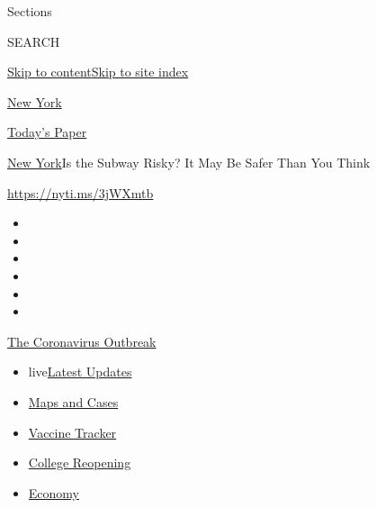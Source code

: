 Sections

SEARCH

\protect\hyperlink{site-content}{Skip to
content}\protect\hyperlink{site-index}{Skip to site index}

\href{https://www.nytimes.com/section/nyregion}{New York}

\href{https://myaccount.nytimes.com/auth/login?response_type=cookie\&client_id=vi}{}

\href{https://www.nytimes.com/section/todayspaper}{Today's Paper}

\href{/section/nyregion}{New York}\textbar{}Is the Subway Risky? It May
Be Safer Than You Think

\url{https://nyti.ms/3jWXmtb}

\begin{itemize}
\item
\item
\item
\item
\item
\item
\end{itemize}

\href{https://www.nytimes.com/news-event/coronavirus?action=click\&pgtype=Article\&state=default\&region=TOP_BANNER\&context=storylines_menu}{The
Coronavirus Outbreak}

\begin{itemize}
\tightlist
\item
  live\href{https://www.nytimes.com/2020/08/03/world/coronavirus-covid-19.html?action=click\&pgtype=Article\&state=default\&region=TOP_BANNER\&context=storylines_menu}{Latest
  Updates}
\item
  \href{https://www.nytimes.com/interactive/2020/us/coronavirus-us-cases.html?action=click\&pgtype=Article\&state=default\&region=TOP_BANNER\&context=storylines_menu}{Maps
  and Cases}
\item
  \href{https://www.nytimes.com/interactive/2020/science/coronavirus-vaccine-tracker.html?action=click\&pgtype=Article\&state=default\&region=TOP_BANNER\&context=storylines_menu}{Vaccine
  Tracker}
\item
  \href{https://www.nytimes.com/2020/08/02/us/covid-college-reopening.html?action=click\&pgtype=Article\&state=default\&region=TOP_BANNER\&context=storylines_menu}{College
  Reopening}
\item
  \href{https://www.nytimes.com/live/2020/08/03/business/stock-market-today-coronavirus?action=click\&pgtype=Article\&state=default\&region=TOP_BANNER\&context=storylines_menu}{Economy}
\end{itemize}

